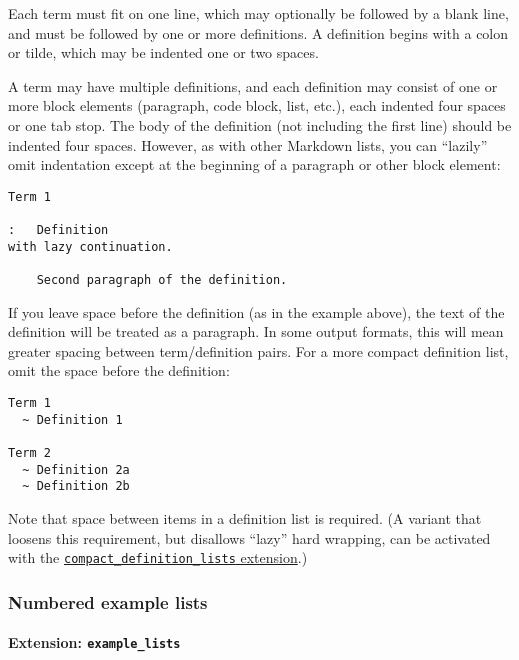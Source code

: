 \documentclass[
  a4paper,
]{article}
\begin{document}
Each term must fit on one line, which may optionally be followed by a
blank line, and must be followed by one or more definitions. A
definition begins with a colon or tilde, which may be indented one or
two spaces.

A term may have multiple definitions, and each definition may consist of
one or more block elements (paragraph, code block, list, etc.), each
indented four spaces or one tab stop. The body of the definition (not
including the first line) should be indented four spaces. However, as
with other Markdown lists, you can ``lazily'' omit indentation except at
the beginning of a paragraph or other block element:

\begin{verbatim}
Term 1

:   Definition
with lazy continuation.

    Second paragraph of the definition.
\end{verbatim}

If you leave space before the definition (as in the example above), the
text of the definition will be treated as a paragraph. In some output
formats, this will mean greater spacing between term/definition pairs.
For a more compact definition list, omit the space before the
definition:

\begin{verbatim}
Term 1
  ~ Definition 1

Term 2
  ~ Definition 2a
  ~ Definition 2b
\end{verbatim}

Note that space between items in a definition list is required. (A
variant that loosens this requirement, but disallows ``lazy'' hard
wrapping, can be activated with the
\protect\hyperlink{extension-compact_definition_lists}{\texttt{compact\_definition\_lists}
extension}.)

\hypertarget{numbered-example-lists}{%
\subsubsection{Numbered example lists}\label{numbered-example-lists}}

\hypertarget{extension-example_lists}{%
\paragraph{\texorpdfstring{Extension:
\texttt{example\_lists}}{Extension: example\_lists}}\label{extension-example_lists}}
\end{document}
